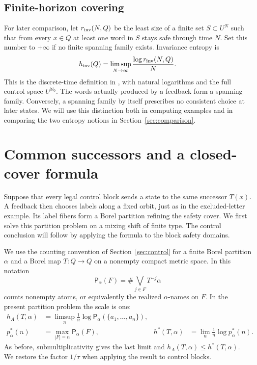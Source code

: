 \documentclass[11pt,reqno]{amsart}
\numberwithin{equation}{section}
\theoremstyle{definition}
\theoremstyle{definition}
\newcommand{\Nzero}{\mathbb N_0}
\newcommand{\Patt}{\mathsf P}
\newcommand{\hinv}{h_{\mathrm{inv}}}
\begin{document}
\subsection{Finite-horizon covering}
For later comparison, let $r_{\rm inv}(N,Q)$ be the least size of a
finite set $S\subset U^N$ such that from every $x\in Q$ at least
one word in $S$ stays safe through time $N$. Set this number to
$+\infty$ if no finite spanning family exists. Invariance entropy is
\begin{equation}\label{eq:hinv-definition}
 \hinv(Q)=\limsup_{N\to\infty}\frac{\log r_{\rm inv}(N,Q)}{N}.
\end{equation}
This is the discrete-time definition in
\cite[Definition~2.2]{Kawan2013}, with natural logarithms and the
full control space $U^{\Nzero}$. The words actually produced by a
feedback form a spanning family. Conversely, a spanning family by
itself prescribes no consistent choice at later states. We will use
this distinction both in computing examples and in comparing the
two entropy notions in Section~\ref{sec:comparison}.

\section{Common successors and a closed-cover formula}\label{sec:closed-cover}

Suppose that every legal control block sends a state to the same
successor $T(x)$. A feedback then chooses labels along a fixed orbit,
just as in the excluded-letter example. Its label fibers form a Borel
partition refining the safety cover. We first solve this partition
problem on a mixing shift of finite type. The control conclusion will
follow by applying the formula to the block safety domains.

We use the counting convention of Section~\ref{sec:control} for a
finite Borel partition $\alpha$ and a Borel map $T:Q\to Q$ on a
nonempty compact metric space. In this notation
\[
 \Patt_\alpha(F)=\#\bigvee_{j\in F}T^{-j}\alpha
\]
counts nonempty atoms, or equivalently the realized $\alpha$-names
on $F$. In the present partition problem the scale is one:
\begin{align}
 h_A(T,\alpha)&=\limsup_n\frac1n
       \log\Patt_\alpha(\{a_1,\ldots,a_n\}),\label{cc-eq:seq}\\
 p_\alpha^*(n)&=\max_{|F|=n}\Patt_\alpha(F),
 &h^*(T,\alpha)&=\lim_n\frac1n\log p_\alpha^*(n).
 \label{cc-eq:pat}
\end{align}
As before, submultiplicativity gives the last limit and
$h_A(T,\alpha)\le h^*(T,\alpha)$. We restore the factor
$1/\tau$ when applying the result to control blocks.
\end{document}
